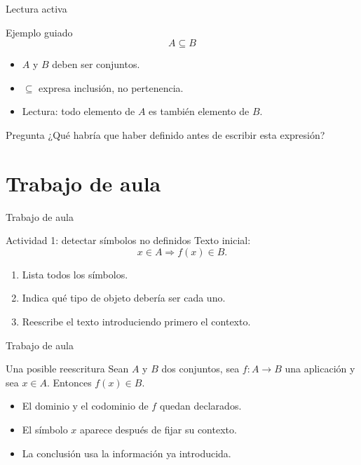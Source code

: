 \documentclass[aspectratio=169,11pt]{beamer}
\begin{document}
\begin{frame}{Lectura activa}
\begin{block}{Ejemplo guiado}
\[
  A\subseteq B
\]
\begin{itemize}
  \item \(A\) y \(B\) deben ser conjuntos.
  \item \(\subseteq\) expresa inclusión, no pertenencia.
  \item Lectura: todo elemento de \(A\) es también elemento de \(B\).
\end{itemize}
\end{block}

\begin{alertblock}{Pregunta}
¿Qué habría que haber definido antes de escribir esta expresión?
\end{alertblock}
\end{frame}

\section{Trabajo de aula}

\begin{frame}{Trabajo de aula}
\begin{block}{Actividad 1: detectar símbolos no definidos}
Texto inicial:
\[
  x\in A \Rightarrow f(x)\in B.
\]
\begin{enumerate}
  \item Lista todos los símbolos.
  \item Indica qué tipo de objeto debería ser cada uno.
  \item Reescribe el texto introduciendo primero el contexto.
\end{enumerate}
\end{block}
\end{frame}

\begin{frame}{Trabajo de aula}
\begin{block}{Una posible reescritura}
Sean \(A\) y \(B\) dos conjuntos, sea \(f:A\to B\) una aplicación y sea \(x\in A\).
Entonces \(f(x)\in B\).
\end{block}

\begin{itemize}
  \item El dominio y el codominio de \(f\) quedan declarados.
  \item El símbolo \(x\) aparece después de fijar su contexto.
  \item La conclusión usa la información ya introducida.
\end{itemize}
\end{frame}
\end{document}
